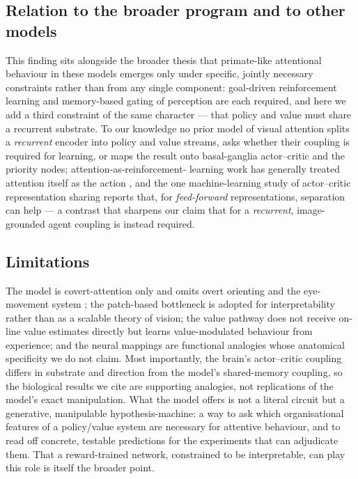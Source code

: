 \subsection{Relation to the broader program and to other models}
This finding sits alongside the broader thesis that primate-like attentional behaviour
in these models emerges only under specific, jointly necessary constraints rather than
from any single component: goal-driven reinforcement learning and memory-based gating
of perception are each required, and here we add a third constraint of the same
character --- that policy and value must share a recurrent substrate. To our knowledge
no prior model of visual attention splits a \emph{recurrent} encoder into policy and
value streams, asks whether their coupling is required for learning, or maps the result
onto basal-ganglia actor--critic and the priority nodes; attention-as-reinforcement-
learning work has generally treated attention itself as the action
\citep{mnih2014recurrent, minut2001reinforcement}, and the one machine-learning study of
actor--critic representation sharing reports that, for \emph{feed-forward}
representations, separation can help --- a contrast that sharpens our claim that for a
\emph{recurrent}, image-grounded agent coupling is instead required.

\subsection{Limitations}
The model is covert-attention only and omits overt orienting and the eye-movement system
\citep{hoffman1995visual, deubel1996saccade}; the patch-based bottleneck is adopted for
interpretability rather than as a scalable theory of vision; the value pathway does not
receive on-line value estimates directly but learns value-modulated behaviour from
experience; and the neural mappings are functional analogies whose anatomical
specificity we do not claim. Most importantly, the brain's actor--critic coupling differs
in substrate and direction from the model's shared-memory coupling, so the biological
results we cite are supporting analogies, not replications of the model's exact
manipulation. What the model offers is not a literal circuit but a generative,
manipulable hypothesis-machine: a way to ask which organisational features of a
policy/value system are necessary for attentive behaviour, and to read off concrete,
testable predictions for the experiments that can adjudicate them. That a reward-trained
network, constrained to be interpretable, can play this role is itself the broader point.
